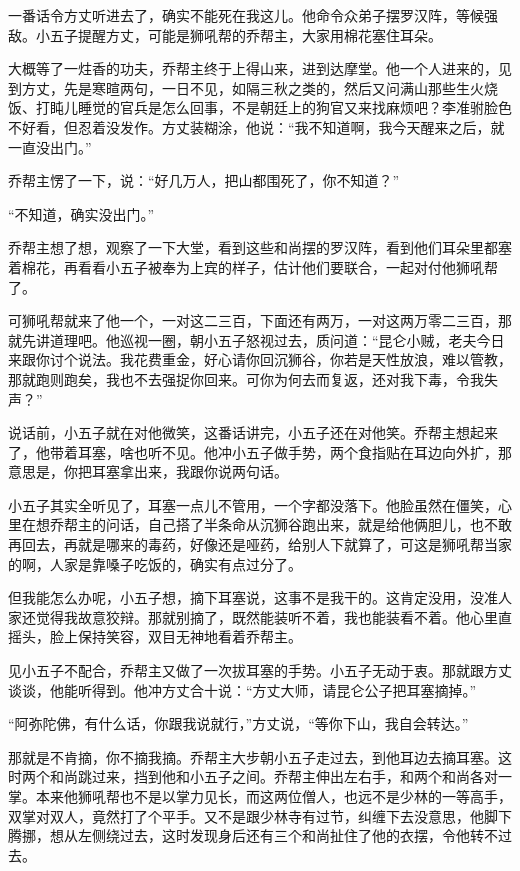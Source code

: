 一番话令方丈听进去了，确实不能死在我这儿。他命令众弟子摆罗汉阵，等候强敌。小五子提醒方丈，可能是狮吼帮的乔帮主，大家用棉花塞住耳朵。

大概等了一炷香的功夫，乔帮主终于上得山来，进到达摩堂。他一个人进来的，见到方丈，先是寒暄两句，一日不见，如隔三秋之类的，然后又问满山那些生火烧饭、打盹儿睡觉的官兵是怎么回事，不是朝廷上的狗官又来找麻烦吧？李准驸脸色不好看，但忍着没发作。方丈装糊涂，他说：“我不知道啊，我今天醒来之后，就一直没出门。”

乔帮主愣了一下，说：“好几万人，把山都围死了，你不知道？”

“不知道，确实没出门。”

乔帮主想了想，观察了一下大堂，看到这些和尚摆的罗汉阵，看到他们耳朵里都塞着棉花，再看看小五子被奉为上宾的样子，估计他们要联合，一起对付他狮吼帮了。

可狮吼帮就来了他一个，一对这二三百，下面还有两万，一对这两万零二三百，那就先讲道理吧。他巡视一圈，朝小五子怒视过去，质问道：“昆仑小贼，老夫今日来跟你讨个说法。我花费重金，好心请你回沉狮谷，你若是天性放浪，难以管教，那就跑则跑矣，我也不去强捉你回来。可你为何去而复返，还对我下毒，令我失声？”

说话前，小五子就在对他微笑，这番话讲完，小五子还在对他笑。乔帮主想起来了，他带着耳塞，啥也听不见。他冲小五子做手势，两个食指贴在耳边向外扩，那意思是，你把耳塞拿出来，我跟你说两句话。

小五子其实全听见了，耳塞一点儿不管用，一个字都没落下。他脸虽然在僵笑，心里在想乔帮主的问话，自己搭了半条命从沉狮谷跑出来，就是给他俩胆儿，也不敢再回去，再就是哪来的毒药，好像还是哑药，给别人下就算了，可这是狮吼帮当家的啊，人家是靠嗓子吃饭的，确实有点过分了。

但我能怎么办呢，小五子想，摘下耳塞说，这事不是我干的。这肯定没用，没准人家还觉得我故意狡辩。那就别摘了，既然能装听不着，我也能装看不着。他心里直摇头，脸上保持笑容，双目无神地看着乔帮主。

见小五子不配合，乔帮主又做了一次拔耳塞的手势。小五子无动于衷。那就跟方丈谈谈，他能听得到。他冲方丈合十说：“方丈大师，请昆仑公子把耳塞摘掉。”

“阿弥陀佛，有什么话，你跟我说就行，”方丈说，“等你下山，我自会转达。”

那就是不肯摘，你不摘我摘。乔帮主大步朝小五子走过去，到他耳边去摘耳塞。这时两个和尚跳过来，挡到他和小五子之间。乔帮主伸出左右手，和两个和尚各对一掌。本来他狮吼帮也不是以掌力见长，而这两位僧人，也远不是少林的一等高手，双掌对双人，竟然打了个平手。又不是跟少林寺有过节，纠缠下去没意思，他脚下腾挪，想从左侧绕过去，这时发现身后还有三个和尚扯住了他的衣摆，令他转不过去。

